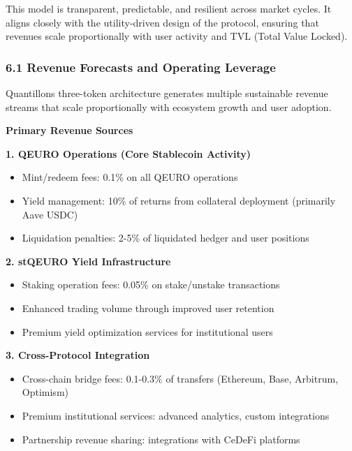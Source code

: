 This model is transparent, predictable, and resilient across market
cycles. It aligns closely with the utility-driven design of the
protocol, ensuring that revenues scale proportionally with user activity
and TVL (Total Value Locked).

\hypertarget{revenue-forecasts-and-operating-leverage}{%
\subsubsection{6.1 Revenue Forecasts and Operating
Leverage}\label{revenue-forecasts-and-operating-leverage}}

Quantillon\textquotesingle s three-token architecture generates multiple
sustainable revenue streams that scale proportionally with ecosystem
growth and user adoption.

\textbf{Primary Revenue Sources}

\textbf{1. QEURO Operations (Core Stablecoin Activity)}

\begin{itemize}
\item
  Mint/redeem fees: 0.1\% on all QEURO operations
\item
  Yield management: 10\% of returns from collateral deployment
  (primarily Aave USDC)
\item
  Liquidation penalties: 2-5\% of liquidated hedger and user positions
\end{itemize}

\textbf{2. stQEURO Yield Infrastructure}

\begin{itemize}
\item
  Staking operation fees: 0.05\% on stake/unstake transactions
\item
  Enhanced trading volume through improved user retention
\item
  Premium yield optimization services for institutional users
\end{itemize}

\textbf{3. Cross-Protocol Integration}

\begin{itemize}
\item
  Cross-chain bridge fees: 0.1-0.3\% of transfers (Ethereum, Base,
  Arbitrum, Optimism)
\item
  Premium institutional services: advanced analytics, custom
  integrations
\item
  Partnership revenue sharing: integrations with CeDeFi platforms
\end{itemize}

